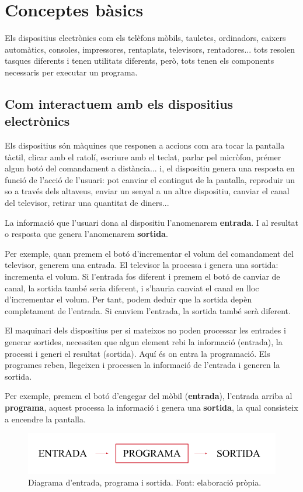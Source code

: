 \section{Conceptes bàsics}
Els dispositius electrònics com els telèfons mòbils, tauletes, ordinadors, caixers automàtics, consoles, impressores, rentaplats, televisors, rentadores... tots resolen tasques diferents i tenen utilitats diferents, però, tots tenen els components necessaris per executar un programa.

\subsection{Com interactuem amb els dispositius electrònics}
Els dispositius són màquines que responen a accions com ara tocar la pantalla tàctil, clicar amb el ratolí, escriure amb el teclat, parlar pel micròfon, prémer algun botó del comandament a distància... i, el dispositiu genera una resposta en funció de l'acció de l'usuari: pot canviar el contingut de la pantalla, reproduir un so a través dels altaveus, enviar un senyal a un altre dispositiu, canviar el canal del televisor, retirar una quantitat de diners...

La informació que l'usuari dona al dispositiu l'anomenarem \textbf{entrada}. I al resultat o resposta que genera l'anomenarem \textbf{sortida}. 

Per exemple, quan premem el botó d'incrementar el volum del comandament del televisor, generem una entrada. El televisor la processa i genera una sortida: incrementa el volum. Si l'entrada fos diferent i premem el botó de canviar de canal, la sortida també seria diferent, i s'hauria canviat el canal en lloc d'incrementar el volum. Per tant, podem deduir que la sortida depèn completament de l'entrada. Si canviem l'entrada, la sortida també serà diferent.

El maquinari dels dispositius per si mateixos no poden processar les entrades i generar sortides, necessiten que algun element rebi la informació (entrada), la processi i generi el resultat (sortida). Aquí és on entra la programació. Els programes reben, llegeixen i processen la informació de l'entrada i generen la sortida.

Per exemple, premem el botó d'engegar del mòbil (\textbf{entrada}), l'entrada arriba al \textbf{programa}, aquest processa la informació i genera una \textbf{sortida}, la qual consisteix a encendre la pantalla.

\begin{figure}[h]
    \centering
    \includegraphics[width=.7\textwidth]{capitols/figures/i_o prog.png}
    \caption[Diagrama d'entrada, programa i sortida.]{Diagrama d'entrada, programa i sortida. Font: elaboració pròpia.}
    \label{Figura}
\end{figure}

